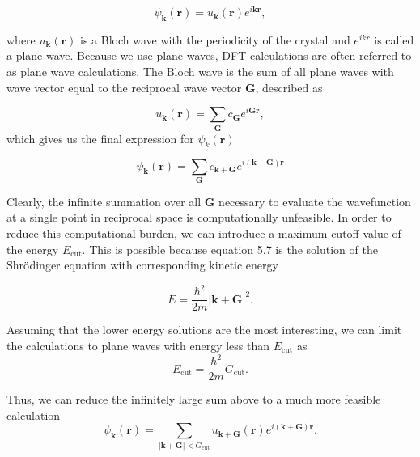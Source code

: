 \begin{equation}
\psi_{\boldsymbol{k}}(\boldsymbol{r}) = u_{\boldsymbol{k}}(\boldsymbol{r})e^{i\boldsymbol{k}\boldsymbol{r}},    
\end{equation}

where $u_{\boldsymbol{k}}(\boldsymbol{r})$ is a Bloch wave with the periodicity of the crystal and $e^{ikr}$ is called a plane wave. Because we use plane waves, DFT calculations are often referred to as plane wave calculations. The Bloch wave is the sum of all plane waves with wave vector equal to the reciprocal wave vector $\boldsymbol{G}$, described as 

\begin{equation}
    u_{\boldsymbol{k}}(\boldsymbol{r}) = \sum_{\boldsymbol{G}} c_{\boldsymbol{G}}e^{i\boldsymbol{G}\boldsymbol{r}},
\end{equation}
 which gives us the final expression for $\psi_k (\boldsymbol{r})$ 
 
\begin{equation}
    \psi_{\boldsymbol{k}}(\boldsymbol{r}) = \sum_{\boldsymbol{G}} c_{\boldsymbol{k} + \boldsymbol{G}}e^{i(\boldsymbol{k} + \boldsymbol{G})\boldsymbol{r}}
\end{equation}

Clearly, the infinite summation over all $\boldsymbol{G}$ necessary to evaluate the wavefunction at a single point in reciprocal space is computationally unfeasible. In order to reduce this computational burden, we can introduce a maximum cutoff value of the energy $E_{\text{cut}}$. This is possible because equation 5.7 is the solution of the Shr\"{o}dinger equation with corresponding kinetic energy 

\begin{equation}
    E = \frac{\hbar^2}{2m}|\boldsymbol{k} + \boldsymbol{G}|^2.
\end{equation}

Assuming that the lower energy solutions are the most interesting, we can limit the calculations to plane waves with energy less than $E_{\text{cut}}$ as
\begin{equation}
    E_{\text{cut}} = \frac{\hbar^2}{2m}G_{\text{cut}}.
\end{equation}

Thus, we can reduce the infinitely large sum above to a much more feasible calculation
\begin{equation}
    \psi_{\boldsymbol{k}}(\boldsymbol{r}) = \sum_{|\boldsymbol{k} + \boldsymbol{G}| < G_{\text{cut}}} u_{\boldsymbol{k} + \boldsymbol{G}}(\boldsymbol{r})e^{i(\boldsymbol{k} + \boldsymbol{G})\boldsymbol{r}}.
\end{equation}

